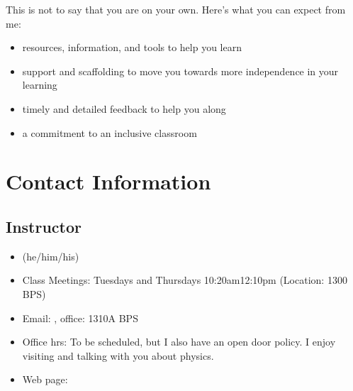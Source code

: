 \documentclass[letterpaper,10pt,english]{jupyterBook}
\begin{document}
\sphinxAtStartPar
This is not to say that you are on your own. Here’s what you can expect from me:
\begin{itemize}
\item {} 
\sphinxAtStartPar
resources, information, and tools to help you learn

\item {} 
\sphinxAtStartPar
support and scaffolding to move you towards more independence in your learning

\item {} 
\sphinxAtStartPar
timely and detailed feedback to help you along

\item {} 
\sphinxAtStartPar
a commitment to an inclusive classroom

\end{itemize}


\section{Contact Information}
\label{\detokenize{content/0_course/syllabus:contact-information}}

\subsection{Instructor}
\label{\detokenize{content/0_course/syllabus:instructor}}\begin{itemize}
\item {} 
\sphinxAtStartPar
{} (he/him/his)

\item {} 
\sphinxAtStartPar
Class Meetings: Tuesdays and Thursdays 10:20am\sphinxhyphen{}12:10pm (Location: 1300 BPS)

\item {} 
\sphinxAtStartPar
Email: , office: 1310\sphinxhyphen{}A BPS

\item {} 
\sphinxAtStartPar
Office hrs: To be scheduled, but I also have an open door policy. I enjoy visiting and talking with you about physics.

\item {} 
\sphinxAtStartPar
Web page:

\end{itemize}
\end{document}
